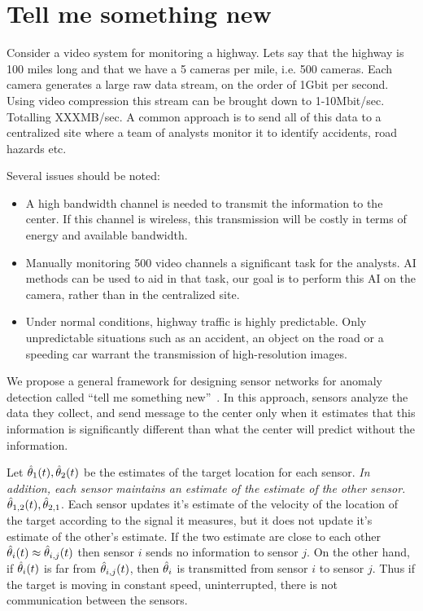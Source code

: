 \section{Tell me something new}

Consider a video system for monitoring a highway. Lets say that the
highway is 100 miles long and that we have a 5 cameras per mile,
i.e. 500 cameras. Each camera generates a large raw data stream, on
the order of 1Gbit per second. Using video compression this stream can
be brought down to 1-10Mbit/sec. Totalling XXXMB/sec. A common approach
is to send all of this data to a centralized site where a team of
analysts monitor it to identify accidents, road hazards etc.

Several issues should be noted:
\begin{itemize}
\item A high bandwidth channel is needed to transmit the information
  to the center. If this channel is wireless, this transmission will
  be costly in terms of energy and available bandwidth.
\item Manually monitoring 500 video channels a significant task for
  the analysts. AI methods can be used to aid in that task, our goal
  is to perform this AI on the camera, rather than in the centralized
  site.
\item Under normal conditions, highway traffic is highly
  predictable. Only unpredictable situations such as an accident, an
  object on the road or a speeding car warrant the transmission of
  high-resolution images.
\end{itemize}

We propose a general framework for designing sensor networks for
anomaly detection called ``tell me something new''~\cite{TMSN}. In
this approach, sensors analyze the data they collect, and send message
to the center only when it estimates that this information is
significantly different than what the center will predict without the
information.

Let $\hat{\theta}_1(t),\hat{\theta}_2(t)$ be the estimates of the target
location for each sensor. {\em In addition, each sensor maintains an
  estimate of the estimate of the other sensor.}
$\hat{\theta}_{1,2}(t),\hat{\theta}_{2,1}$. Each sensor updates it's estimate of
the velocity of the location of the target according to the signal it
measures, but it does not update it's estimate of the other's
estimate.  If the two estimate are close to each other $\hat{\theta}_i(t)
\approx \hat{\theta}_{i,j}(t)$ then sensor $i$ sends no information to
sensor $j$. On the other hand, if $\hat{\theta}_i(t)$ is far from
$\hat{\theta}_{i,j}(t)$, then $\hat{\theta}_{i}$ is transmitted from sensor $i$
to sensor $j$. Thus if the target is moving in constant speed,
uninterrupted, there is not communication between the sensors.

